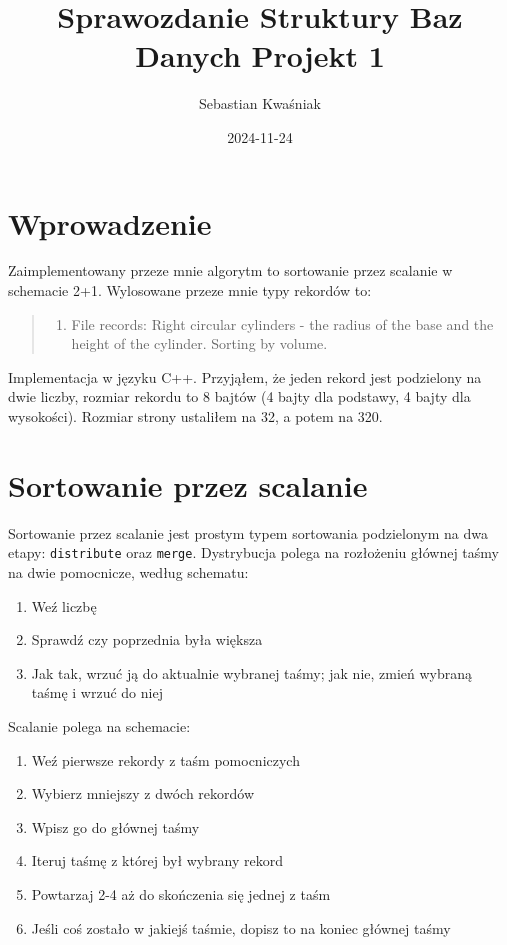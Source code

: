 \documentclass[
]{article}
\title{Sprawozdanie Struktury Baz Danych Projekt 1}
\author{Sebastian Kwaśniak}
\date{2024-11-24}
\providecommand{\tightlist}{%
  \setlength{\itemsep}{0pt}\setlength{\parskip}{0pt}}
\begin{document}
\maketitle

\renewcommand{\figurename}{Rys.}

\section{Wprowadzenie}\label{wprowadzenie}

Zaimplementowany przeze mnie algorytm to sortowanie przez scalanie w
schemacie 2+1. Wylosowane przeze mnie typy rekordów to:

\begin{quote}
\begin{enumerate}
\def\labelenumi{\arabic{enumi}.}
\setcounter{enumi}{28}
\tightlist
\item
  File records: Right circular cylinders - the radius of the base and
  the height of the cylinder. Sorting by volume.
\end{enumerate}
\end{quote}

Implementacja w języku C++. Przyjąłem, że jeden rekord jest podzielony
na dwie liczby, rozmiar rekordu to 8 bajtów (4 bajty dla podstawy, 4
bajty dla wysokości). Rozmiar strony ustaliłem na 32, a potem na 320.

\section{Sortowanie przez scalanie}\label{sortowanie-przez-scalanie}

Sortowanie przez scalanie jest prostym typem sortowania podzielonym na
dwa etapy: \texttt{distribute} oraz \texttt{merge}. Dystrybucja polega
na rozłożeniu głównej taśmy na dwie pomocnicze, według schematu:

\begin{enumerate}
\def\labelenumi{\arabic{enumi}.}
\tightlist
\item
  Weź liczbę
\item
  Sprawdź czy poprzednia była większa
\item
  Jak tak, wrzuć ją do aktualnie wybranej taśmy; jak nie, zmień wybraną
  taśmę i wrzuć do niej
\end{enumerate}

Scalanie polega na schemacie:

\begin{enumerate}
\def\labelenumi{\arabic{enumi}.}
\tightlist
\item
  Weź pierwsze rekordy z taśm pomocniczych
\item
  Wybierz mniejszy z dwóch rekordów
\item
  Wpisz go do głównej taśmy
\item
  Iteruj taśmę z której był wybrany rekord
\item
  Powtarzaj 2-4 aż do skończenia się jednej z taśm
\item
  Jeśli coś zostało w jakiejś taśmie, dopisz to na koniec głównej taśmy
\end{enumerate}
\end{document}
